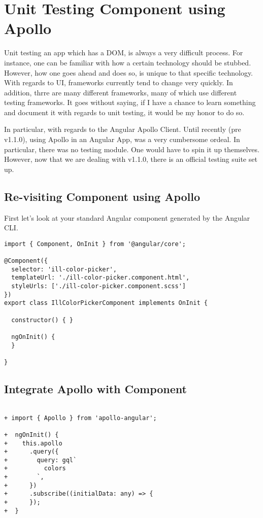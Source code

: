 
\section{ Unit Testing Component using Apollo }

Unit testing an app which has a DOM, is always a very difficult process. For
instance, one can be familiar with how a certain technology should be stubbed.
However, how one goes ahead and does so, is unique to that specific technology.
With regards to UI, frameworks currently tend to change very quickly. In
addition, thrre are many different frameworks, many of which use different
testing frameworks. It goes without saying, if I have a chance to learn
something and document it with regards to unit testing, it would be my honor to
do so.

In particular, with regards to the Angular Apollo Client. Until recently
(pre v1.1.0), using Apollo in an Angular App, was a very cumbersome ordeal.
In particular, there was no testing module. One would have to spin it up
themselves. However, now that we are dealing with v1.1.0, there is an official
testing suite set up.

\subsection { Re-visiting Component using Apollo }
First let's look at your standard Angular component generated by the Angular
CLI.

\begin{lstlisting}
import { Component, OnInit } from '@angular/core';

@Component({
  selector: 'ill-color-picker',
  templateUrl: './ill-color-picker.component.html',
  styleUrls: ['./ill-color-picker.component.scss']
})
export class IllColorPickerComponent implements OnInit {

  constructor() { }

  ngOnInit() {
  }

}
\end{lstlisting}

\subsection { Integrate Apollo with Component }

\begin{lstlisting}

+ import { Apollo } from 'apollo-angular';

+  ngOnInit() {
+    this.apollo
+      .query({
+        query: gql`
+          colors
+        `,
+      })
+      .subscribe((initialData: any) => {
+      });
+  }
\end{lstlisting}

